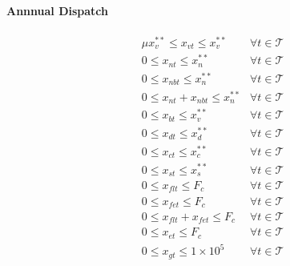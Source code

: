 \documentclass[9pt, oneside]{article}
\numberwithin{equation}{subsubsection}
\begin{document}
\paragraph{Annnual Dispatch}
\begin{subequations}
	\begin{align}
		 & \mu x_v^{**}\leq x_{vt} \leq x_v^{**} & \forall t \in \mathcal{T}\label{eqn:bound1b} \\
		 & 0 \leq x_{nt} \leq x_n^{**}           & \forall t \in \mathcal{T}\label{eqn:bound2}  \\
		 & 0 \leq x_{nbt} \leq x_n^{**}          & \forall t \in \mathcal{T}\label{eqn:bound2}  \\
		 & 0 \leq x_{nt} + x_{nbt} \leq x_n^{**} & \forall t \in \mathcal{T}\label{eqn:bound2}  \\
		 & 0 \leq x_{bt} \leq x_v^{**}           & \forall t \in \mathcal{T}\label{eqn:bound2}  \\
		 & 0 \leq x_{dt} \leq x_d^{**}           & \forall t \in \mathcal{T}\label{eqn:bound2}  \\
		 & 0 \leq x_{ct} \leq x_c^{**}           & \forall t \in \mathcal{T}\label{eqn:bound3}  \\
		 & 0 \leq x_{st} \leq x_s^{**}           & \forall t \in \mathcal{T}\label{eqn:bound4}  \\
		 & 0 \leq x_{flt} \leq F_c               & \forall t \in \mathcal{T}\label{eqn:bound5}  \\
		 & 0 \leq x_{fet} \leq F_c               & \forall t \in \mathcal{T}\label{eqn:bound6}  \\
		 & 0 \leq x_{flt} + x_{fet} \leq F_c     & \forall t \in \mathcal{T}\label{eqn:bound6b} \\
		 & 0 \leq x_{et} \leq F_c                & \forall t \in \mathcal{T}\label{eqn:bound7}  \\
		 & 0 \leq x_{gt} \leq 1\times10^5        & \forall t \in \mathcal{T}\label{eqn:bound8}
	\end{align}
\end{subequations}
\end{document}
